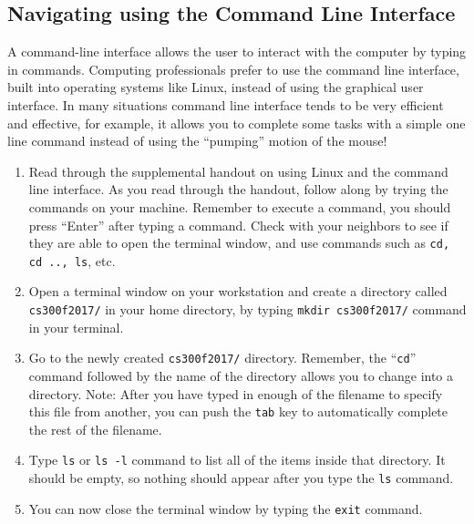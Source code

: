 \vspace*{-.2in}
\subsection*{Navigating using the Command Line Interface}
\vspace*{-.1in}
A command-line interface allows the user to interact with the computer by typing in commands. Computing professionals prefer to use the command line interface, built into operating systems like Linux, instead of using the graphical user interface. In many situations command line interface tends to be very efficient and effective, for example, it allows you to complete some tasks with a simple one line command instead of using the ``pumping'' motion of the mouse!
\vspace*{-.1in}
\begin{enumerate}
  \item Read through the supplemental handout on using Linux and the command line interface. As you read through the handout, follow along by trying the commands on your machine. Remember to execute a command, you should press ``Enter'' after typing a command. Check with your neighbors to see if they are able to open the terminal window, and use commands such as {\tt cd, cd .., ls}, etc.

  \item Open a terminal window on your workstation and create a directory  called {\tt cs300f2017/}  in your home directory, by typing {\tt mkdir cs300f2017/} command in your terminal.  

  \item Go to the newly created {\tt cs300f2017/} directory. Remember, the ``{\tt cd}'' command followed by the name of the directory allows you to change into a directory. Note: After you have typed in enough of the filename to specify this file from another, you can push the {\tt tab} key to automatically complete the rest of the filename.

  \item Type {\tt ls} or {\tt ls -l} command to list all of the items inside that directory. It should be empty, so nothing should appear after you type the {\tt ls} command.

  \item You can now close the terminal window by typing the {\tt exit} command. 
\end{enumerate}

\vspace*{-.2in}
